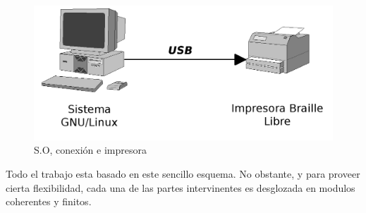 \begin{figure}[htp]
\centering
\includegraphics[width=13cm]{./img/pc_usb_printer.png}
\caption{S.O, conexi\'on e impresora}
\label{fig:pc_usb_printer}
\end{figure}

Todo el trabajo esta basado en este sencillo esquema. No obstante, y para
proveer cierta flexibilidad, cada una de las partes intervinentes es
desglozada en modulos coherentes y finitos.